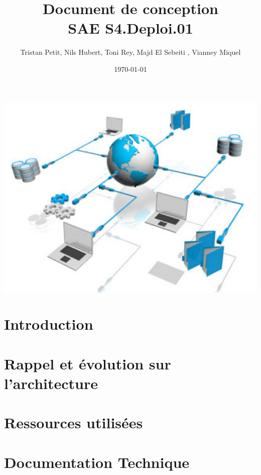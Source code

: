 \documentclass{article}
\begin{document}
\title{Document de conception \\ SAE S4.Deploi.01}
\author{Tristan Petit, Nils Hubert, Toni Rey, 
 Majd El Sebeiti , Vianney Miquel}
\date{\today}
\maketitle
\begin{center}
    \vspace{1cm} %
    \includegraphics[width=1\textwidth]{Images/Logo-project.jpeg} %
\end{center}

\maketitle

\newpage
\renewcommand{\contentsname}{Table des matières}

\tableofcontents

\newpage
{}

\section{Introduction}

\section{Rappel et évolution sur l'architecture}

\section{Ressources utilisées}

\section{Documentation Technique}


\end{document}
